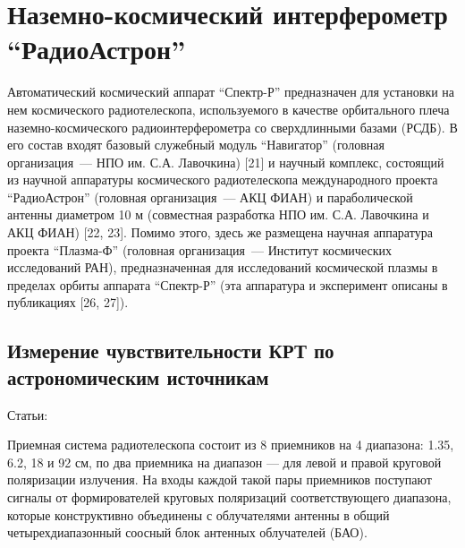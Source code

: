 \chapter{Наземно-космический интерферометр ``РадиоАстрон''} \label{chapt2}


Автоматический космический аппарат ``Спектр-Р'' предназначен для установки на нем космического радиотелескопа, используемого в качестве орбитального плеча наземно-космического
радиоинтерферометра со сверхдлинными базами (РСДБ). В его состав входят базовый служебный модуль
``Навигатор'' (головная организация~--- НПО им. С.А. Лавочкина) [21] и научный комплекс, состоящий
из научной аппаратуры космического радиотелескопа международного проекта ``РадиоАстрон'' (головная
организация~--- АКЦ ФИАН) и параболической антенны диаметром 10 м (совместная разработка НПО им.
С.А. Лавочкина и АКЦ ФИАН) [22, 23]. Помимо этого, здесь же размещена научная аппаратура проекта
``Плазма-Ф'' (головная организация~--- Институт космических исследований РАН), предназначенная для
исследований космической плазмы в пределах орбиты аппарата ``Спектр-Р'' (эта аппаратура и
эксперимент описаны в публикациях [26, 27]).


\section{Измерение чувствительности КРТ по астрономическим источникам}

Статьи: \cite{Kardashev_2013_rus, Kovalev_2014_rus}

Приемная система радиотелескопа состоит из 8
приемников на 4 диапазона: 1.35, 6.2, 18 и 92 см,
по два приемника на диапазон --- для левой и правой круговой поляризации излучения. На входы
каждой такой пары приемников поступают сигналы
от формирователей круговых поляризаций соответствующего диапазона, которые конструктивно
объединены с облучателями антенны в общий четырехдиапазонный соосный блок антенных облучателей
(БАО).


